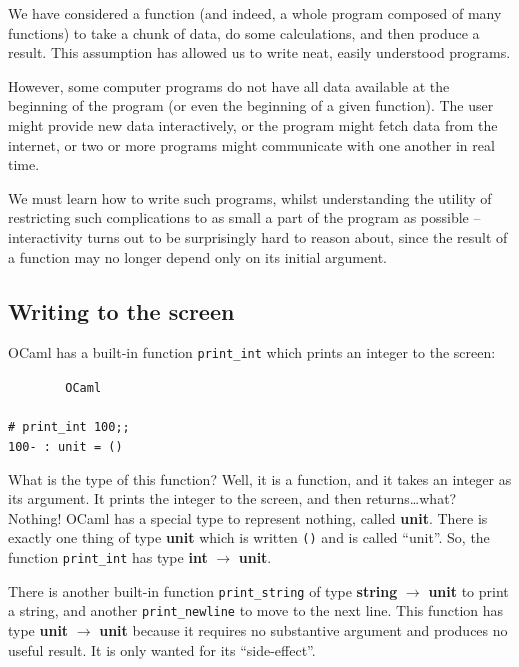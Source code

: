 \documentclass[]{book}
\newcommand{\smspace}{\vspace{4mm}}
\begin{document}
We have considered a function (and indeed, a whole program composed of many functions) to take a chunk of data, do some calculations, and then produce a result. This assumption has allowed us to write neat, easily understood programs.

However, some computer programs do not have all data available at the beginning of the program (or even the beginning of a given function). The user might provide new data interactively, or the program might fetch data from the internet, or two or more programs might communicate with one another in real time.

We must learn how to write such programs, whilst understanding the utility of restricting such complications to as small a part of the program as possible -- interactivity turns out to be surprisingly hard to reason about, since the result of a function may no longer depend only on its initial argument.

\subsection*{Writing to the screen}

OCaml has a built-in function \texttt{print\_int} which prints an integer to the screen:

\smspace
\noindent\verb!        OCaml!\\
\noindent\\
\noindent\verb!# print_int 100;;!\\
\noindent\verb!100- : unit = ()!
\smspace

\noindent{}What is the type of this function? Well, it is a function, and it takes an integer as its argument. It prints the integer to the screen, and then returns\ldots what? Nothing! OCaml has a special type to represent nothing, called \textbf{\textsf{unit}}. There is exactly one thing of type \textsf{\textbf{unit}} which is written \texttt{()} and is called ``unit''. So, the function \texttt{print\_int} has type \textsf{\textbf{int} $\rightarrow$ \textbf{unit}}.

There is another built-in function \texttt{print\_string} of type \textsf{\textbf{string} $\rightarrow$ \textbf{unit}} to print a string, and another \texttt{print\_newline} to move to the next line. This function has type \textsf{\textbf{unit} $\rightarrow$ \textbf{unit}} because it requires no substantive argument and produces no useful result. It is only wanted for its ``side-effect''.
\end{document}
